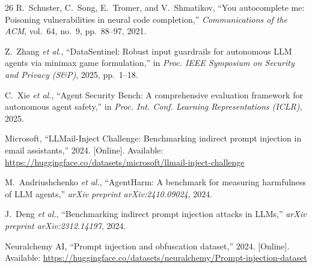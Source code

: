 \documentclass[conference]{IEEEtran}
\begin{document}
\begin{thebibliography}{26}
R.~Schuster, C.~Song, E.~Tromer, and V.~Shmatikov, ``You autocomplete me: Poisoning vulnerabilities in neural code completion,'' \textit{Communications of the ACM}, vol.~64, no.~9, pp.~88--97, 2021.

Z.~Zhang \textit{et al.}, ``DataSentinel: Robust input guardrails for autonomous LLM agents via minimax game formulation,'' in \textit{Proc. IEEE Symposium on Security and Privacy (S\&P)}, 2025, pp.~1--18.

C.~Xie \textit{et al.}, ``Agent Security Bench: A comprehensive evaluation framework for autonomous agent safety,'' in \textit{Proc. Int. Conf. Learning Representations (ICLR)}, 2025.

Microsoft, ``LLMail-Inject Challenge: Benchmarking indirect prompt injection in email assistants,'' 2024. [Online]. Available: \url{https://huggingface.co/datasets/microsoft/llmail-inject-challenge}

M.~Andriushchenko \textit{et al.}, ``AgentHarm: A benchmark for measuring harmfulness of LLM agents,'' \textit{arXiv preprint arXiv:2410.09024}, 2024.

J.~Deng \textit{et al.}, ``Benchmarking indirect prompt injection attacks in LLMs,'' \textit{arXiv preprint arXiv:2312.14197}, 2024.

Neuralchemy AI, ``Prompt injection and obfuscation dataset,'' 2024. [Online]. Available: \url{https://huggingface.co/datasets/neuralchemy/Prompt-injection-dataset}

\end{thebibliography}
\end{document}
